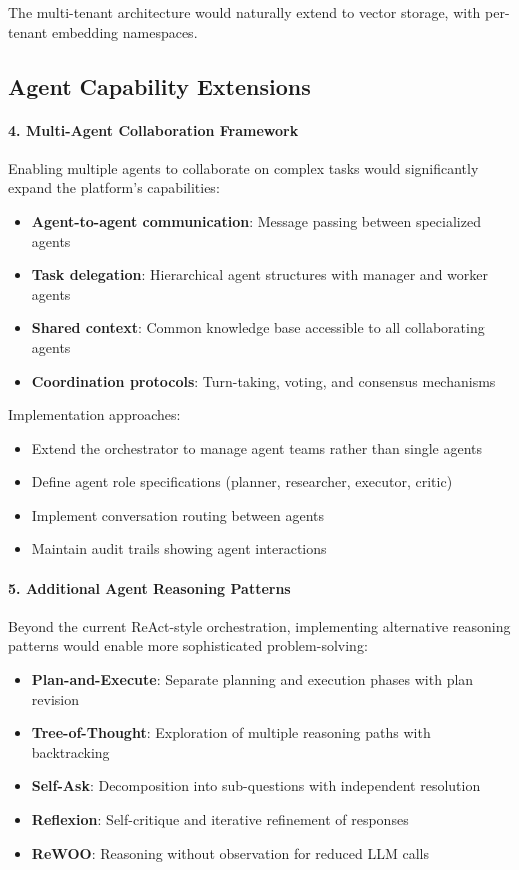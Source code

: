 The multi-tenant architecture would naturally extend to vector storage, with per-tenant embedding namespaces.

\subsection{Agent Capability Extensions}

\paragraph{4. Multi-Agent Collaboration Framework}

Enabling multiple agents to collaborate on complex tasks would significantly expand the platform's capabilities:

\begin{itemize}
    \item \textbf{Agent-to-agent communication}: Message passing between specialized agents
    \item \textbf{Task delegation}: Hierarchical agent structures with manager and worker agents
    \item \textbf{Shared context}: Common knowledge base accessible to all collaborating agents
    \item \textbf{Coordination protocols}: Turn-taking, voting, and consensus mechanisms
\end{itemize}

Implementation approaches:
\begin{itemize}
    \item Extend the orchestrator to manage agent teams rather than single agents
    \item Define agent role specifications (planner, researcher, executor, critic)
    \item Implement conversation routing between agents
    \item Maintain audit trails showing agent interactions
\end{itemize}

\paragraph{5. Additional Agent Reasoning Patterns}

Beyond the current ReAct-style orchestration, implementing alternative reasoning patterns would enable more sophisticated problem-solving:

\begin{itemize}
    \item \textbf{Plan-and-Execute}: Separate planning and execution phases with plan revision
    \item \textbf{Tree-of-Thought}: Exploration of multiple reasoning paths with backtracking
    \item \textbf{Self-Ask}: Decomposition into sub-questions with independent resolution
    \item \textbf{Reflexion}: Self-critique and iterative refinement of responses
    \item \textbf{ReWOO}: Reasoning without observation for reduced LLM calls
\end{itemize}

